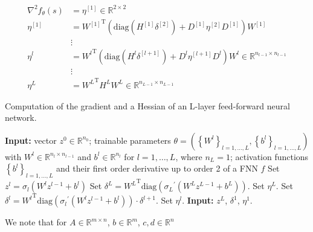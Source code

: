 \begin{align*}
    \nabla^{2} f_{\theta}\left(s\right) & = \eta^{[1]} \in \mathbb{R}^{2 \times 2} \\
    \eta^{[1]} & = {W^{[1]}}^{\mathrm{T}} \left( \mathrm{diag}\left(H^{[1]} \delta^{[2]}\right) + D^{[1]} \eta^{[2]} D^{[1]} \right) W^{[1]} \\
    & \vdots \\
    \eta^{l} & = {W^{l}}^{\mathrm{T}} \left( \mathrm{diag}\left(H^{l} \delta^{[l+1]}\right) + D^{l} \eta^{[l+1]} D^{l} \right) W^{l} \in \mathbb{R}^{n_{l-1} \times n_{l-1}} \\
    & \vdots \\
    \eta^{L} & = {W^{L}}^{\mathrm{T}} H^{L} W^{L} \in \mathbb{R}^{n_{L-1} \times n_{L-1}}
\end{align*} 


\begin{algorithm}[H]
    \caption{Computation of the gradient and a Hessian of an L-layer feed-forward neural network.}
    \begin{algorithmic}[1]
        \State \textbf{Input:} vector $z^0 \in \mathbb{R}^{n_0}$; trainable parameters $\theta = \left(\left\{ W^l \right\}_{l = 1, \ldots, L}, \left\{ b^l \right\}_{l = 1, \ldots, L}\right)$ with $W^l \in \mathbb{R}^{n_l \times n_{l-1}}$ and $b^l \in \mathbb{R}^{n_l}$ for $l = 1, \ldots, L$, where $n_L = 1$; activation functions $\left\{ b^l \right\}_{l = 1, \ldots, L}$ and their first order derivative up to order 2 of a FNN $f$
            \State Set $z^l = \sigma_l\left(W^l z^{l-1} + b^l\right)$
        \EndFor
        \State Set $\delta^{L} = {W^{L}}^{\mathrm{T}} \mathrm{diag}\left({\sigma_{L}}^{\prime}\left(W^{L} z^{L-1} + b^{L}\right)\right)$.
        \State Set $\eta^{L}$.
            \State Set $\delta^{l} = {W^{l}}^{\mathrm{T}} \mathrm{diag}\left({\sigma_{l}}^{\prime}\left(W^{l} z^{l-1} + b^{l}\right)\right) \cdot \delta^{l+1}$.
            \State Set $\eta^{l}$.
        \EndFor
        \State \textbf{Input:} $z^L$, $\delta^1$, $\eta^1$.
    \end{algorithmic}
\end{algorithm}




  






We note that for $A \in \mathbb{R}^{m \times n}$, $b \in \mathbb{R}^{m}$, $c, d \in \mathbb{R}^{n}$

